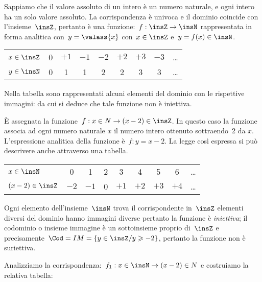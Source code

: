 \begin{exrig}
\begin{esempio}
Sappiamo che il valore assoluto di un intero è un numero naturale, e
ogni intero ha un solo valore assoluto. La corrispondenza è univoca e
il dominio coincide con l'insieme~$\insZ$, pertanto è una
funzione:~$f: \insZ\rightarrow\insN$ rappresentata in forma
analitica con~${y=\valass{x}}$ con~$x\in\insZ$ e~$y=f(x)\in\insN$.

\begin{center}
\begin{tabular}{l*8{c}}
 \toprule
$x\in \insZ$ & 0 & $+1$ & $-1$ & $-2$ & $+2$ & $+3$ & $-3$ & \ldots\\
$y\in \insN$ & 0 & 1 & 1 & 2 & 2 & 3 & 3 & \ldots \\
\bottomrule
\end{tabular}
\end{center}
Nella tabella sono rappresentati alcuni elementi del dominio
con le rispettive immagini: da cui si deduce che tale funzione non è
iniettiva.
 \end{esempio}

 \begin{esempio}
 \label{ex:D.6}
È assegnata la funzione~$f:x\in N\rightarrow (x-2)\in\insZ$. In questo caso la 
funzione associa ad ogni numero naturale $x$ il
numero intero ottenuto sottraendo~2 da $x$. L'espressione analitica della 
funzione è~$f: y = x-2$. La legge così espressa si può descrivere anche 
attraverso una
tabella.

\begin{center}
\begin{tabular}{l*8{c}}
 \toprule
$x\in \insN$ & 0 & 1 & 2 & 3 & 4 & 5 & 6 & \ldots \\
$(x-2)\in \insZ$ & $-2$ & $-1$ & 0 & $+1$ & $+2$ & $+3$ & $+4$ & \ldots \\
\bottomrule
\end{tabular}
\end{center}

Ogni elemento dell'insieme~$\insN$ trova il corrispondente in~$\insZ$ elementi 
diversi del dominio hanno immagini diverse pertanto la
funzione è \emph{iniettiva}; il codominio o insieme immagine è un sottoinsieme 
proprio di~$\insZ$ e precisamente~$\Cod = IM =\{y\in\insZ/y\geqslant -2\}$,
pertanto la funzione non è suriettiva.
 \end{esempio}

 \begin{esempio}
 \label{ex:D.7}
 Analizziamo la corrispondenza:~$f_{1}:x\in \insN\rightarrow (x-2)\in N$ e 
costruiamo la relativa tabella:


\end{esempio}
\end{exrig}
